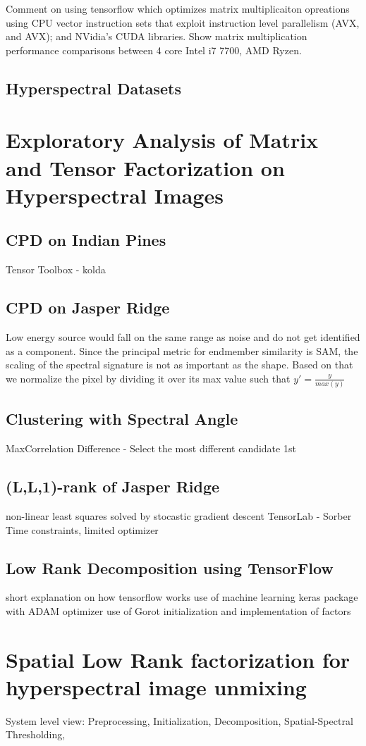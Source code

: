 Comment on using tensorflow which optimizes matrix multiplicaiton opreations using CPU vector instruction sets that exploit instruction level parallelism (AVX, and AVX); and NVidia's CUDA libraries.   Show matrix multiplication performance comparisons between 4 core Intel i7 7700, AMD Ryzen.

\section{Hyperspectral Datasets}


\chapter{Exploratory Analysis of Matrix and Tensor Factorization on Hyperspectral Images} %
\section{CPD on Indian Pines}
Tensor Toolbox - kolda
\section{CPD on Jasper Ridge}
	Low energy source would fall on the same range as noise and do not get identified as a component.  Since the principal metric for endmember similarity is SAM, the scaling of the spectral signature is not as important as the shape.  Based on that we normalize the pixel by dividing it over its max value such that $y' = \frac{y}{max(y)}$ 
\section{Clustering with Spectral Angle }
	MaxCorrelation Difference - Select the most different candidate 1st
	
\section{(L,L,1)-rank of Jasper Ridge}
non-linear least squares solved by stocastic gradient descent
TensorLab - Sorber
Time constraints, limited optimizer

\section{Low Rank Decomposition using TensorFlow}
short explanation on how tensorflow works
use of machine learning keras package with ADAM optimizer
use of Gorot initialization and implementation of factors 

\chapter{Spatial Low Rank factorization for hyperspectral image unmixing}
System level view: Preprocessing, Initialization, Decomposition, Spatial-Spectral Thresholding, 